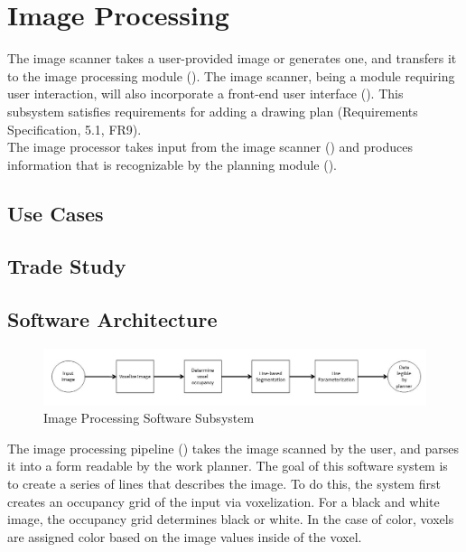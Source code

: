 
\section{Image Processing}
\label{sec:image_processing}

The image scanner takes a user-provided image or generates one, and transfers it to the image processing module (). The image scanner, being a module requiring user interaction, will also incorporate a front-end user interface (). This subsystem satisfies requirements for adding a drawing plan (Requirements Specification, 5.1, FR9). \\

The image processor takes input from the image scanner () and produces information that is recognizable by the planning module (). \\

\subsection{Use Cases}

\subsection{Trade Study}

\subsection{Software Architecture}
\label{sec:sw_arch_image_processing}

\begin{figure}[h!]
 \centering
  \includegraphics[width=0.99\columnwidth]{diagrams/sw_arch_image_processing.jpg}
	\caption{Image Processing Software Subsystem}
 \label{fig:image_processing}
\end{figure}

The image processing pipeline () takes the image scanned by the user, and parses it into a form readable by the work planner. The goal of this software system is to create a series of lines that describes the image. To do this, the system first creates an occupancy grid of the input via voxelization. For a black and white image, the occupancy grid determines black or white. In the case of color, voxels are assigned color based on the image values inside of the voxel.

